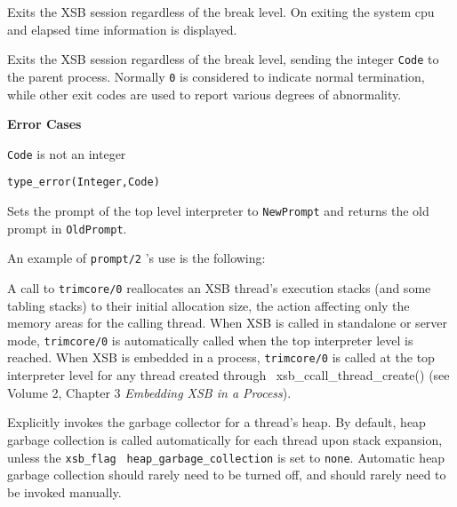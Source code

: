 \begin{description}
%
    Exits the XSB session regardless of the break level.  On exiting
    the system cpu and elapsed time information is displayed.

%
Exits the XSB session regardless of the break level, sending the
integer {\tt Code} to the parent process.  Normally {\tt 0} is
considered to indicate normal termination, while other exit codes are
used to report various degrees of abnormality.

{\bf Error Cases}
\bi
\item 	{\tt Code} is not an integer
\bi
\item 	{\tt type\_error(Integer,Code)}
\ei
\ei

    Sets the prompt of the top level interpreter to {\tt NewPrompt} and 
    returns the old prompt in {\tt OldPrompt}.

    An example of {\tt prompt/2} 's use is the following:


%
A call to {\tt trimcore/0} reallocates an XSB thread's execution
stacks (and some tabling stacks) to their initial allocation size, the
action affecting only the memory areas for the calling thread.  When
XSB is called in standalone or server mode, {\tt trimcore/0} is
automatically called when the top interpreter level is reached.  When
XSB is embedded in a process, {\tt trimcore/0} is called at the top
interpreter level for any thread created through
{\ xsb\_ccall\_thread\_create()} (see Volume 2, Chapter 3 {\em
  Embedding XSB in a Process}).

%
Explicitly invokes the garbage collector for a thread's heap. By
default, heap garbage collection is called automatically for each
thread upon stack expansion, unless the {\tt xsb\_flag} {\tt
  heap\_garbage\_collection} is set to {\tt none}.  Automatic heap
garbage collection should rarely need to be turned off, and should
rarely need to be invoked manually.


\end{description}
